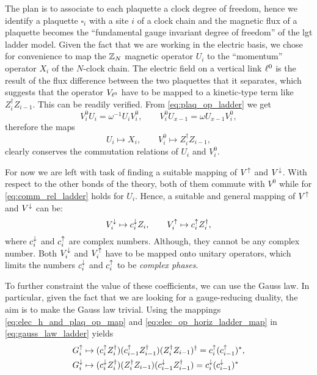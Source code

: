 The plan is to associate to each plaquette a clock degree of freedom, hence we identify a plaquette $\square_i$ with a site $i$ of a clock chain and the magnetic flux of a plaquette becomes the ``fundamental gauge invariant degree of freedom'' of the \ac{lgt} ladder model.
Given the fact that we are working in the electric basis, we chose for convenience to map the $\mathbb{Z}_N$ magnetic operator $U_i$ to the ``momentum'' operator $X_i$ of the $N$-clock chain.
The electric field on a vertical link $\ell^0$ is the result of the flux difference between the two plaquettes that it separates, which suggests that the operator $V_{\ell^0}$ have to be mapped to a kinetic-type term like $Z_i^\dagger Z_{i-1}$.
This can be readily verified.
From \eqref{eq:plaq_op_ladder} we get
\begin{equation*}
    V^0_i U_i = \omega^{-1} U_i V_i^0, \qquad
    V^0_i U_{x-1} = \omega U_{x-1} V_i^0,
\end{equation*}
therefore the maps
\begin{equation*}
    U_i \mapsto X_i, \qquad
    V^0_i \mapsto Z_i^\dagger Z_{i-1},
    \label{eq:elec_h_and_plaq_op_map}
\end{equation*}
clearly conserves the commutation relations of $U_i$ and $V^0_i$.

For now we are left with task of finding a suitable mapping of $V^{\uparrow}$ and $V^{\downarrow}$.
With respect to the other bonds of the theory, both of them commute with $V^0$ while for \eqref{eq:comm_rel_ladder} holds for $U_i$.
Hence, a suitable and general mapping of $V^{\uparrow}$ and $V^{\downarrow}$ can be:
\begin{equation}
    V^{\downarrow}_i \mapsto c^{\downarrow}_i Z_i, \qquad
    V^{\uparrow}_i \mapsto c^{\uparrow}_i Z_i^\dagger,
    \label{eq:elec_op_horiz_ladder_map}
\end{equation}
where $c^{\downarrow}_i$ and $c^{\uparrow}_i$ are complex numbers.
Although, they cannot be any complex number.
Both $V^{\downarrow}_i$ and $V^{\uparrow}_i$ have to be mapped onto unitary operators, which limits the numbers $c^{\downarrow}_i$ and $c^{\uparrow}_i$ to be \emph{complex phases}.

To further constraint the value of these coefficients, we can use the Gauss law.
In particular, given the fact that we are looking for a gauge-reducing duality, the aim is to make the Gauss law trivial.
Using the mappings \eqref{eq:elec_h_and_plaq_op_map} and \eqref{eq:elec_op_horiz_ladder_map} in \eqref{eq:gauss_law_ladder} yields
\begin{equation}
    \begin{split}
        G^\uparrow_i & \mapsto
        (c^{\uparrow}_i Z_i^\dagger) (c^{\uparrow}_{i-1} Z_{i-1}^\dagger) (Z_i^\dagger Z_{i-1})^\dagger
        = c^{\uparrow}_i (c^{\uparrow}_{i-1})^*, \\
        G^\downarrow_i & \mapsto
        (c^{\downarrow}_i Z_i^\dagger) (Z_i^\dagger Z_{i-1}) (c^{\downarrow}_{i-1} Z_{i-1}^\dagger)
        = c^{\downarrow}_i (c^{\downarrow}_{i-1})^*
    \end{split}
    \label{eq:gauss_law_map_ladder}
\end{equation}

